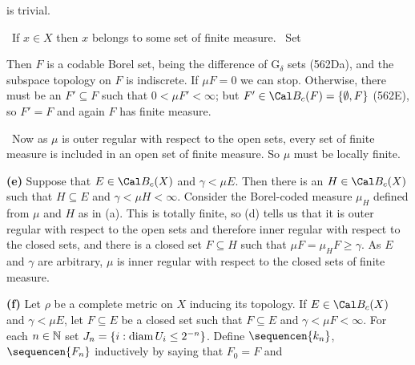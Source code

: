 {\medskip

 is trivial.

\medskip

\grheada\ If $x\in X$ then $x$ belongs to
some set of finite measure.   \Prf\ Set


\noindent Then $F$ is a codable Borel set, being the difference of
G$_{\delta}$ sets (562Da), 
and the subspace topology on $F$ is indiscrete.   If $\mu F=0$
we can stop.   Otherwise, there must be an $F'\subseteq F$ such that
$0<\mu F'<\infty$;  but $F'\in\Cal B_c(F)=\{\emptyset,F\}$ (562E),
so $F'=F$ and
again $F$ has finite measure.\ \Qed

\medskip

\qquad\grheadb\ Now as $\mu$ is outer regular with respect to the open
sets, every set of finite measure is included in an open set of finite
measure.   So $\mu$ must be locally finite.

\medskip

{\bf (e)} Suppose that $E\in\Cal B_c(X)$ and
$\gamma<\mu E$.   Then there is an $H\in\Cal B_c(X)$ such that
$H\subseteq E$ and $\gamma<\mu H<\infty$.   Consider the Borel-coded
measure
$\mu_H$ defined from $\mu$ and $H$ as in (a).   This is totally finite,
so (d) tells us that it is outer regular with respect to the open sets and
therefore inner regular with respect to the closed sets,
and there is a closed set $F\subseteq H$ such that $\mu F=\mu_HF\ge\gamma$.
As $E$ and $\gamma$ are arbitrary, $\mu$ is inner regular with respect to
the closed sets of finite measure.

\medskip

{\bf (f)} Let $\rho$ be a complete
metric on $X$ inducing its topology.
If $E\in\Cal B_c(X)$ and $\gamma<\mu E$, let $F\subseteq E$ be a
closed set such that $F\subseteq E$ and $\gamma<\mu F<\infty$.
For each $n\in\Bbb N$ set $J_n=\{i:\mathop{\text{diam}} U_i\le 2^{-n}\}$.
Define $\sequencen{k_n}$, $\sequencen{F_n}$ inductively by saying that
$F_0=F$ and


}
